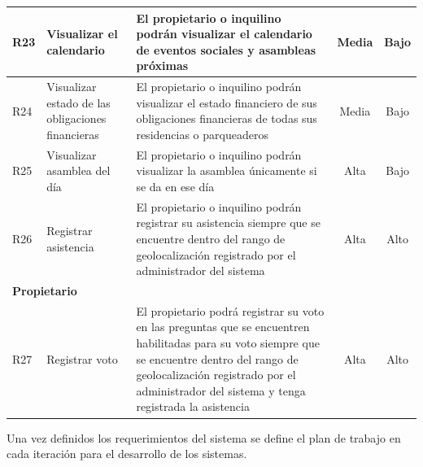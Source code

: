 \begin{footnotesize}
\begin{spacing}{1}
\begin{center}
\begin{longtable}[l]{|p{}|p{}|p{}|p{}| p{}|}
            \hline
            R23         & Visualizar el calendario                          & El propietario o inquilino podrán visualizar el calendario de eventos sociales y asambleas próximas & \multicolumn{1}{c|}{Media} & \multicolumn{1}{c|}{Bajo}\\
            \hline
            R24         & Visualizar estado de las obligaciones financieras & El propietario o inquilino podrán visualizar el estado financiero de sus obligaciones financieras de todas sus residencias o parqueaderos & \multicolumn{1}{c|}{Media} & \multicolumn{1}{c|}{Bajo}\\
            \hline
            R25         & Visualizar asamblea del día                       & El propietario o inquilino podrán visualizar la asamblea únicamente si se da en ese día & \multicolumn{1}{c|}{Alta} & \multicolumn{1}{c|}{Bajo}\\
            \hline
            R26         & Registrar asistencia                              & El propietario o inquilino podrán registrar su asistencia siempre que se encuentre dentro del rango de geolocalización registrado por el administrador del sistema & \multicolumn{1}{c|}{Alta} & \multicolumn{1}{c|}{Alto}\\
            \hline
            \multicolumn{5}{|l|}{ \textbf{Propietario} } \\
            \hline
            R27         & Registrar voto                                    & El propietario podrá registrar su voto en las preguntas que se encuentren habilitadas para su voto siempre que se encuentre dentro del rango de geolocalización registrado por el administrador del sistema y tenga registrada la asistencia& \multicolumn{1}{c|}{Alta} & \multicolumn{1}{c|}{Alto}\\
            \hline
        \end{longtable}
    \end{center}
\end{spacing}
\end{footnotesize}
Una vez definidos los requerimientos del sistema se define el plan de trabajo en cada iteración para el desarrollo de los sistemas.
